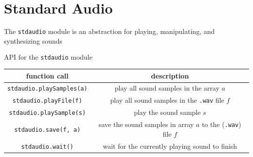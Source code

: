\documentclass[8pt,a4paper,compress]{beamer}
\begin{document}
\section{Standard Audio}
\begin{frame}[fragile]
\pause

The \lstinline{stdaudio} module is an abstraction for playing, manipulating, and synthesizing sounds

\pause
\bigskip

API for the \lstinline{stdaudio} module
\begin{center}
\begin{tabular}{cc}
function call & description \\ \hline
\lstinline$stdaudio.playSamples(a)$ & play all sound samples in the array $a$ \\
\lstinline$stdaudio.playFile(f)$ & play all sound samples in the \lstinline$.wav$ file $f$ \\
\lstinline$stdaudio.playSample(s)$ & play the sound sample $s$ \\
\lstinline$stdaudio.save(f, a)$ & save the sound samples in array $a$ to the (\lstinline$.wav$) file $f$ \\
\lstinline$stdaudio.wait()$ & wait for the currently playing sound to finish
\end{tabular} 
\end{center}
\end{frame}
\end{document}
